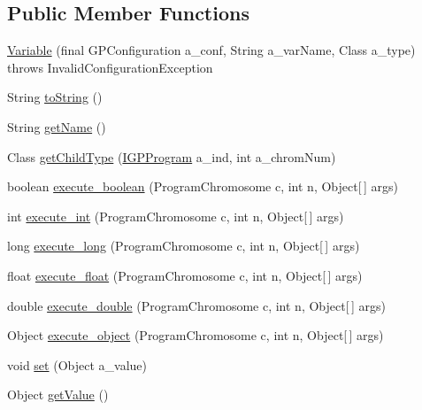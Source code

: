 \subsection*{Public Member Functions}
\begin{DoxyCompactItemize}
\item 
\hyperlink{classorg_1_1jgap_1_1gp_1_1terminal_1_1_variable_ad658279be9b2719c8315c5c2749ec34d}{Variable} (final G\-P\-Configuration a\-\_\-conf, String a\-\_\-var\-Name, Class a\-\_\-type)  throws Invalid\-Configuration\-Exception 
\item 
String \hyperlink{classorg_1_1jgap_1_1gp_1_1terminal_1_1_variable_acc6d9b0409649cf5412c46584696b1be}{to\-String} ()
\item 
String \hyperlink{classorg_1_1jgap_1_1gp_1_1terminal_1_1_variable_a76c54a172436a29013d3be343342dd87}{get\-Name} ()
\item 
Class \hyperlink{classorg_1_1jgap_1_1gp_1_1terminal_1_1_variable_adb06cbcd9005f59b18c45fb6eae8e4c2}{get\-Child\-Type} (\hyperlink{interfaceorg_1_1jgap_1_1gp_1_1_i_g_p_program}{I\-G\-P\-Program} a\-\_\-ind, int a\-\_\-chrom\-Num)
\item 
boolean \hyperlink{classorg_1_1jgap_1_1gp_1_1terminal_1_1_variable_a489fd6b2e601fca749e85a8b97511309}{execute\-\_\-boolean} (Program\-Chromosome c, int n, Object\mbox{[}$\,$\mbox{]} args)
\item 
int \hyperlink{classorg_1_1jgap_1_1gp_1_1terminal_1_1_variable_adba0cb3861520e9f38f0c4fb5a95948b}{execute\-\_\-int} (Program\-Chromosome c, int n, Object\mbox{[}$\,$\mbox{]} args)
\item 
long \hyperlink{classorg_1_1jgap_1_1gp_1_1terminal_1_1_variable_a913d46453a837a28841257a96935c191}{execute\-\_\-long} (Program\-Chromosome c, int n, Object\mbox{[}$\,$\mbox{]} args)
\item 
float \hyperlink{classorg_1_1jgap_1_1gp_1_1terminal_1_1_variable_a65aefbcb2dfb3f02e485a4ee129dfac7}{execute\-\_\-float} (Program\-Chromosome c, int n, Object\mbox{[}$\,$\mbox{]} args)
\item 
double \hyperlink{classorg_1_1jgap_1_1gp_1_1terminal_1_1_variable_a56f12464988e72cf3bd8489de62c1834}{execute\-\_\-double} (Program\-Chromosome c, int n, Object\mbox{[}$\,$\mbox{]} args)
\item 
Object \hyperlink{classorg_1_1jgap_1_1gp_1_1terminal_1_1_variable_a2fe057e3f8429cd2c63c0c8dd24567d6}{execute\-\_\-object} (Program\-Chromosome c, int n, Object\mbox{[}$\,$\mbox{]} args)
\item 
void \hyperlink{classorg_1_1jgap_1_1gp_1_1terminal_1_1_variable_a2c63a1357860d79ccae09c723924d223}{set} (Object a\-\_\-value)
\item 
Object \hyperlink{classorg_1_1jgap_1_1gp_1_1terminal_1_1_variable_a108b7534d27fd89143c83399face8328}{get\-Value} ()
\end{DoxyCompactItemize}
